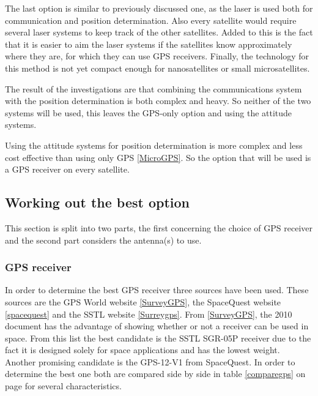 The last option is similar to previously discussed one, as the laser is used both for communication and position determination. Also every satellite would require several laser systems to keep track of the other satellites. Added to this is the fact that it is easier to aim the laser systems if the satellites know approximately where they are, for which they can use \acs{GPS} receivers. Finally, the technology for this method is not yet compact enough for nanosatellites or small microsatellites.

The result of the investigations are that combining the communications system with the position determination is both complex and heavy. So neither of the two systems will be used, this leaves the \acs{GPS}-only option and using the attitude systems.

Using the attitude systems for position determination is more complex and less cost effective than using only \acs{GPS} \ref{MicroGPS}. So the option that will be used is a \acs{GPS} receiver on every satellite.

\subsection{Working out the best option}
\label{navi3}
This section is split into two parts, the first concerning the choice of \acs{GPS} receiver and the second part considers the antenna(s) to use.

\subsubsection{GPS receiver}
In order to determine the best \acs{GPS} receiver three sources have been used. These sources are the GPS World website \ref{SurveyGPS}, the SpaceQuest website \ref{spacequest} and the \ac{SSTL} website \ref{Surreygps}. From \ref{SurveyGPS}, the 2010 document has the advantage of showing whether or not a receiver can be used in space. From this list the best candidate is the \acs{SSTL} SGR-05P receiver due to the fact it is designed solely for space applications and has the lowest weight. Another promising candidate is the GPS-12-V1 from SpaceQuest. In order to determine the best one both are compared side by side in table \ref{comparegps} on page \pageref{comparegps} for several characteristics.

